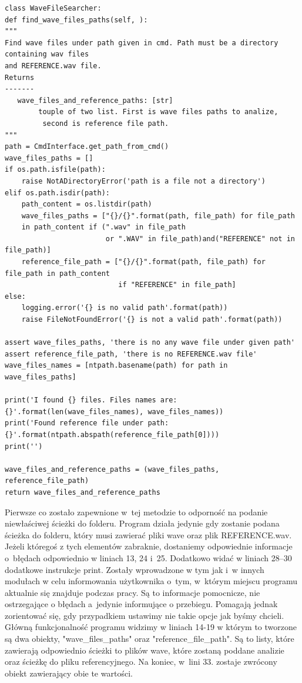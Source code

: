\documentclass[eng,printmode]{mgr}
\begin{document}
\begin{minipage}{\linewidth}
\begin{lstlisting}[caption={Fragment kodu źródłowego pliku WaveFileSearcher.py},captionpos=b,label={WaveFileSearcher}]
class WaveFileSearcher:
def find_wave_files_paths(self, ):
"""
Find wave files under path given in cmd. Path must be a directory containing wav files
and REFERENCE.wav file.
Returns
-------
   wave_files_and_reference_paths: [str]
        touple of two list. First is wave files paths to analize,
         second is reference file path.
"""
path = CmdInterface.get_path_from_cmd()
wave_files_paths = []
if os.path.isfile(path):
    raise NotADirectoryError('path is a file not a directory')
elif os.path.isdir(path):
    path_content = os.listdir(path)
    wave_files_paths = ["{}/{}".format(path, file_path) for file_path
    in path_content if (".wav" in file_path
                        or ".WAV" in file_path)and("REFERENCE" not in file_path)]
    reference_file_path = ["{}/{}".format(path, file_path) for file_path in path_content
                           if "REFERENCE" in file_path]
else:
    logging.error('{} is no valid path'.format(path))
    raise FileNotFoundError('{} is not a valid path'.format(path))

assert wave_files_paths, 'there is no any wave file under given path'
assert reference_file_path, 'there is no REFERENCE.wav file'
wave_files_names = [ntpath.basename(path) for path in wave_files_paths]

print('I found {} files. Files names are: {}'.format(len(wave_files_names), wave_files_names))
print('Found reference file under path: {}'.format(ntpath.abspath(reference_file_path[0])))
print('')

wave_files_and_reference_paths = (wave_files_paths, reference_file_path)
return wave_files_and_reference_paths

\end{lstlisting}
\end{minipage}
Pierwsze co zostało zapewnione w~tej metodzie to odporność na podanie niewłaściwej ścieżki do folderu. Program działa jedynie gdy zostanie podana ścieżka do folderu, który musi zawierać pliki wave oraz plik REFERENCE.wav. Jeżeli któregoś z tych elementów zabraknie, dostaniemy odpowiednie informacje o~błędach odpowiednio w liniach 13, 24 i~25. Dodatkowo widać w liniach 28--30 dodatkowe instrukcje print. Zostały wprowadzone w tym jak i~w innych modułach w celu informowania użytkownika o~tym, w~którym miejscu programu aktualnie się znajduje podczas pracy. Są to informacje pomocnicze, nie ostrzegające o błędach a~jedynie informujące o przebiegu. Pomagają jednak zorientować się, gdy przypadkiem ustawimy nie takie opcje jak byśmy chcieli. Główną funkcjonalność programu widzimy w liniach 14-19 w którym to tworzone są dwa obiekty, "wave\_files\_paths" oraz "reference\_file\_path". Są to listy, które zawierają odpowiednio ścieżki to plików wave, które zostaną poddane analizie oraz ścieżkę do pliku referencyjnego. Na koniec, w~lini 33. zostaje zwrócony obiekt zawierający obie te  wartości.
\end{document}
